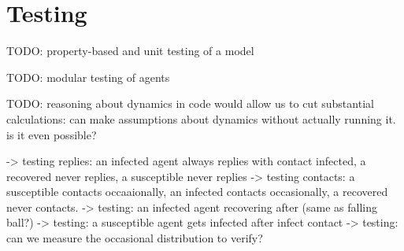 \section{Testing}

TODO: property-based and unit testing of a model

TODO: modular testing of agents

TODO: reasoning about dynamics in code would allow us to cut substantial calculations: can make assumptions about dynamics without actually running it. is it even possible?

\cite{perez_testing_2017}

-> testing replies: an infected agent always replies with contact infected, a recovered never replies, a susceptible never replies
-> testing contacts: a susceptible contacts occaaionally, an infected contacts occasionally, a recovered never contacts.
-> testing: an infected agent recovering after (same as falling ball?)
-> testing: a susceptible agent gets infected after infect contact
-> testing: can we measure the occasional distribution to verify?